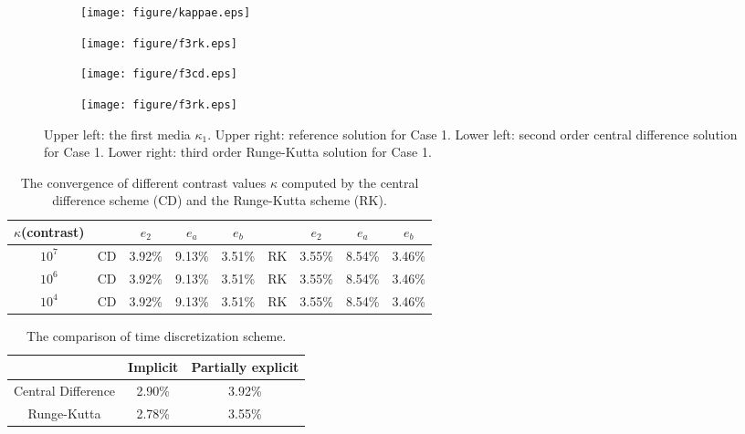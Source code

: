 \documentclass[preprint,12pt]{elsarticle}
\begin{document}
\begin{figure}[H]
    \centering
    \begin{subfigure}[b]{0.37\textwidth}
        \texttt{[image: figure/kappae.eps]}
        \caption{}
        \label{fig:image011}
    \end{subfigure}
    \begin{subfigure}[b]{0.37\textwidth}
        \texttt{[image: figure/f3rk.eps]}
        \caption{}
        \label{fig:image021}
    \end{subfigure}

    \begin{subfigure}[b]{0.37\textwidth}
        \texttt{[image: figure/f3cd.eps]}
        \caption{}
        \label{fig:image031}
    \end{subfigure}
    \begin{subfigure}[b]{0.37\textwidth}
        \texttt{[image: figure/f3rk.eps]}
        \caption{}
        \label{fig:image041}
    \end{subfigure}
    \caption{Upper left: the first media $\kappa_1$. Upper right: reference solution for Case 1. Lower left: second order central difference solution for Case 1. Lower right: third order Runge-Kutta solution for Case 1.}
    \label{fig:k1}
\end{figure}
\begin{table}[H]
\centering
\begin{tabular}{c| c|c c c |c |c c c}
$\kappa$(contrast)&~& $e_2$&$e_a$&$e_b$&~& $e_2$&$e_a$&$e_b$ \\
\hline
$10^{7}$ &CD&3.92\% & 9.13\%&3.51\% &RK&3.55\%&8.54\%&3.46\%\\
\hline
$10^{6}$ &CD&3.92\% &9.13\%&3.51\%&RK&3.55\%&8.54\%&3.46\%\\
\hline
$10^{4}$ &CD&3.92\% &9.13\%&3.51\%&RK&3.55\%&8.54\%&3.46\%\\
\hline
\end{tabular}
\caption{The convergence of different contrast values $\kappa$ computed by the central difference scheme (CD) and the Runge-Kutta scheme (RK).}
 \label{tablek}
\end{table}
\begin{table}[H]
\centering
\begin{tabular}{c|c|c}
~ & Implicit & Partially explicit  \\
\hline
Central Difference& 2.90\% & 3.92\%  \\
\hline
Runge-Kutta & 2.78\% & 3.55\%  \\
\hline
\end{tabular}
\caption{The comparison of time discretization scheme.}
 \label{tableMKc300}
\end{table}
\end{document}
